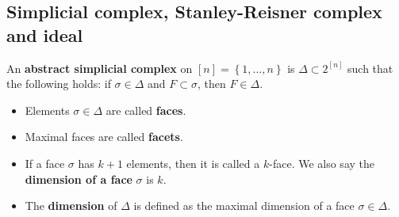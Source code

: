 \documentclass[a4paper, 11pt]{article}
\begin{document}
\subsection{Simplicial complex, Stanley-Reisner complex and ideal}

\begin{defi}
  An \textbf{abstract simplicial complex} on \( [n] = \left\{ 1, \dots, n \right\} \) is \( \Delta \subset 2^{[n]} \) such that the following holds: if \( \sigma \in \Delta \) and \( F \subset \sigma \), then \( F \in \Delta \).
\end{defi}

\begin{itemize}
  \item Elements \( \sigma \in \Delta \) are called \textbf{faces}.
  \item Maximal faces are called \textbf{facets}.
  \item If a face \( \sigma \) has \( k+1 \) elements, then it is called a \( k \)-face. We also say the \textbf{dimension of a face} \( \sigma \) is \( k \).
  \item The \textbf{dimension} of \( \Delta \) is defined as the maximal dimension of a face \( \sigma \in \Delta \).
\end{itemize}
\end{document}
